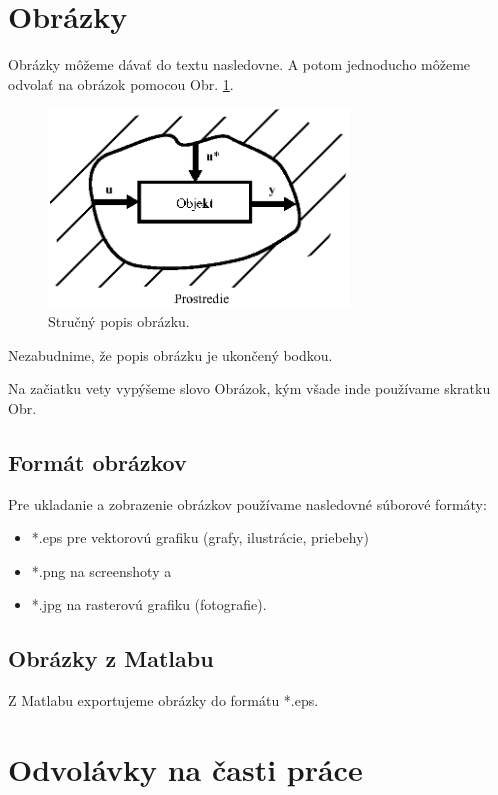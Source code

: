 \section{Obrázky}

Obrázky môžeme dávať do textu nasledovne. A potom jednoducho môžeme odvolať na obrázok pomocou Obr. \ref{OBRAZOK 1.1}.
\begin{figure}[!tbh]
	\centering
	\includegraphics[width=80mm]{obr/OBRAZOK1_1.eps}
	\caption{Stručný popis obrázku.}\label{OBRAZOK 1.1}
\end{figure}
Nezabudnime, že popis obrázku je ukončený bodkou.

Na začiatku vety vypýšeme slovo Obrázok, kým všade inde používame skratku Obr.

\subsection{Formát obrázkov}

Pre ukladanie a zobrazenie obrázkov používame nasledovné súborové formáty:
\begin{itemize}
	\item *.eps pre vektorovú grafiku (grafy, ilustrácie, priebehy)
	\item *.png na screenshoty a
	\item *.jpg na rasterovú grafiku (fotografie).
\end{itemize}

\subsection{Obrázky z Matlabu}

Z Matlabu exportujeme obrázky do formátu *.eps.

\section{Odvolávky na časti práce}
\label{hrusky}

